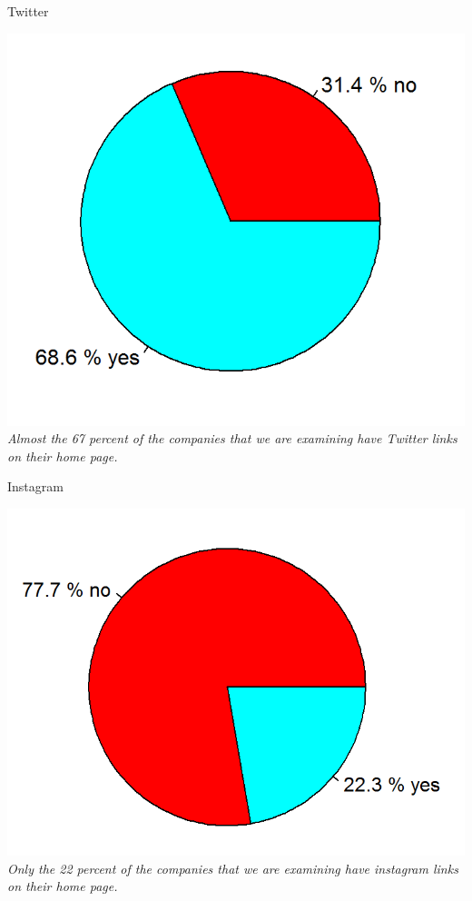 \documentclass{article}
\begin{document}
\begin{table}[H]
\centering
\caption{Twitter}
\begin{center}
\includegraphics[scale=0.6]{../R/photos/12_tw_dist.png}  \\
\textit{Almost the 67 percent of the companies that we are examining have Twitter links on their home page.}
\end{center}
\end{table}

\begin{table}[H]
\centering
\caption{Instagram}
\begin{center}
\includegraphics[scale=0.6]{../R/photos/14_inst_dist.png}  \\
\textit{Only the 22 percent of the companies that we are examining have instagram links on their home page.}
\end{center}
\end{table}
\end{document}
